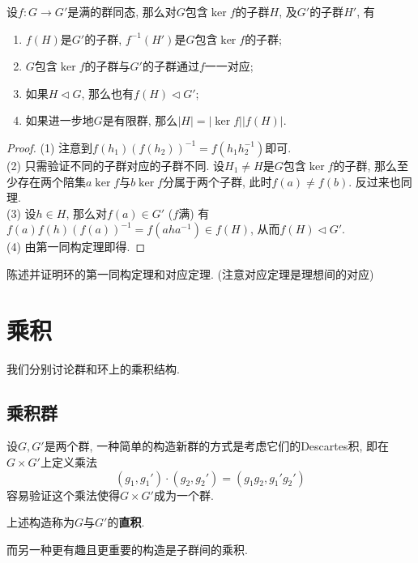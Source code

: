 \begin{thm}[对应定理]
    设$f:G\to G'$是满的群同态, 那么对$G$包含$\ker f$的子群$H$, 及$G'$的子群$H'$, 有
    \begin{enumerate}[(1)]
        \item $f(H)$是$G'$的子群, $f^{-1}(H')$是$G$包含$\ker f$的子群;
        \item $G$包含$\ker f$的子群与$G'$的子群通过$f$一一对应;
        \item 如果$H\lhd G$, 那么也有$f(H)\lhd G'$;
        \item 如果进一步地$G$是有限群, 那么$|H|=|\ker f||f(H)|$.
    \end{enumerate}
\end{thm}
\begin{proof}
    (1) 注意到$f(h_1)(f(h_2))^{-1}=f(h_1h_2^{-1})$即可.\\
    (2) 只需验证不同的子群对应的子群不同.
    设$H_1\neq H$是$G$包含$\ker f$的子群, 那么至少存在两个陪集$a\ker f$与$b\ker f$分属于两个子群, 此时$f(a)\neq f(b)$.
    反过来也同理.\\
    (3) 设$h\in H$, 那么对$f(a)\in G'$ ($f$满) 有$f(a)f(h)(f(a))^{-1}=f(aha^{-1})\in f(H)$, 从而$f(H)\lhd G'$.\\
    (4) 由第一同构定理即得.
\end{proof}

\begin{ex}
    陈述并证明环的第一同构定理和对应定理. (注意对应定理是理想间的对应)
\end{ex}

\section{乘积}

我们分别讨论群和环上的乘积结构.

\subsection{乘积群}

设$G,G'$是两个群, 一种简单的构造新群的方式是考虑它们的Descartes积, 即在$G\times G'$上定义乘法
\[(g_1,g_1')\cdot(g_2,g_2')=(g_1g_2,g_1'g_2')\]
容易验证这个乘法使得$G\times G'$成为一个群.

\begin{defn}
    上述构造称为$G$与$G'$的\textbf{直积}.
\end{defn}

而另一种更有趣且更重要的构造是子群间的乘积.

